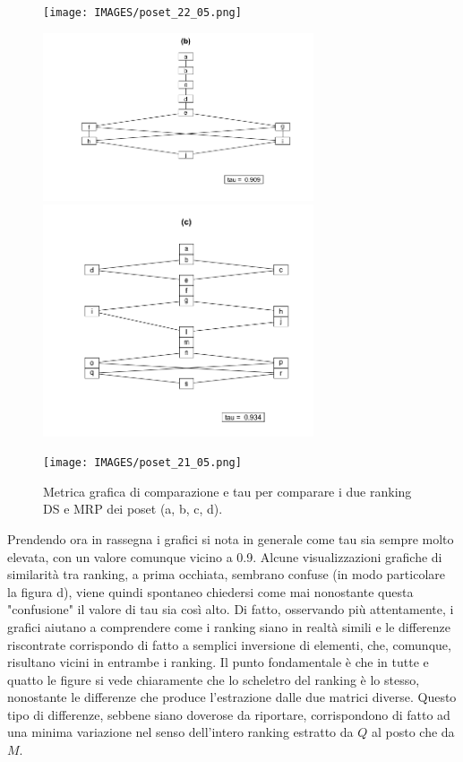 \documentclass{report}
\begin{document}
\begin{figure}[H]
  \centering
  \begin{minipage}[b]{0.4\textwidth}
    \texttt{[image: IMAGES/poset\_22\_05.png]}
  \end{minipage}
  \hfill
  \begin{minipage}[b]{0.4\textwidth}
    \includegraphics[width=8cm]{IMAGES/poset_18_05.png}
  \end{minipage}
  \hfill
  \begin{minipage}[b]{0.4\textwidth}
    \includegraphics[width=8cm]{IMAGES/poset_19_05.png}
  \end{minipage}
  \hfill
  \begin{minipage}[b]{0.4\textwidth}
    \texttt{[image: IMAGES/poset\_21\_05.png]}
  \end{minipage}
  \caption{Metrica grafica di comparazione e tau per comparare i due ranking DS e MRP dei poset (a, b, c, d).}
\end{figure}

Prendendo ora in rassegna i grafici si nota in generale come tau sia sempre molto elevata, con un valore comunque vicino a 0.9. Alcune visualizzazioni grafiche di similarità tra ranking, a prima occhiata, sembrano confuse (in modo particolare la figura d), viene quindi spontaneo chiedersi come mai nonostante questa "confusione" il valore di tau sia così alto. Di fatto, osservando più attentamente, i grafici aiutano a comprendere come i ranking siano in realtà simili e le differenze riscontrate corrispondo di fatto a semplici inversione di elementi, che, comunque, risultano vicini in entrambe i ranking. Il punto fondamentale è che in tutte e quatto le figure si vede chiaramente che lo scheletro del ranking è lo stesso, nonostante le differenze che produce l'estrazione dalle due matrici diverse. Questo tipo di differenze, sebbene siano doverose da riportare, corrispondono di fatto ad una minima variazione nel senso dell'intero ranking estratto da $Q$ al posto che da $M$.
\end{document}
